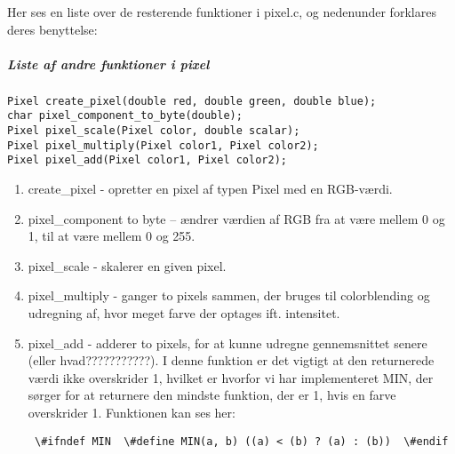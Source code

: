 Her ses en liste over de resterende funktioner i pixel.c, og nedenunder forklares deres benyttelse:

\subparagraph{Liste af andre funktioner i pixel}
\begin{lstlisting}[style=Cstyle, caption=Andre funktioner i pixel]
Pixel create_pixel(double red, double green, double blue);
char pixel_component_to_byte(double);
Pixel pixel_scale(Pixel color, double scalar);
Pixel pixel_multiply(Pixel color1, Pixel color2);
Pixel pixel_add(Pixel color1, Pixel color2);
\end{lstlisting}

\begin{enumerate}

  \item create\_pixel - opretter en pixel af typen Pixel med en RGB-værdi.
  \item pixel\_component to byte – ændrer værdien af RGB fra at være mellem 0 og 1, til at være mellem 0 og 255.
  \item pixel\_scale - skalerer en given pixel.
  \item pixel\_multiply - ganger to pixels sammen, der bruges til colorblending og udregning af, hvor meget farve der optages 								  ift. intensitet.
  \item pixel\_add - adderer to pixels, for at kunne udregne gennemsnittet senere (eller hvad???????????). I denne funktion er 							 det vigtigt at den returnerede værdi ikke overskrider 1, hvilket er hvorfor vi har implementeret MIN, der 							 sørger for at returnere den mindste funktion, der er 1, hvis en farve overskrider 1. Funktionen kan ses her:
  
 \lstinline$
\#ifndef MIN

\#define MIN(a, b) ((a) < (b) ? (a) : (b))

\#endif$  					

\end{enumerate}

